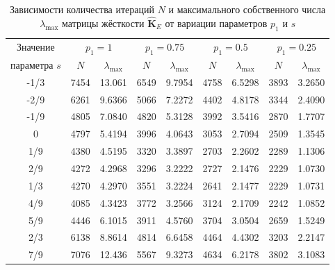 \begin{table}[htbp]
    \centering
    \begin{threeparttable}%
        \caption{Зависимости количества итераций $N$ и максимального собственного числа $\lambda_{\max}$ матрицы жёсткости $\widehat{\textbf{K}}_E$ от вариации параметров $p_1$ и $s$}\label{tab:MechanicalIterAndMaxEgien}
        \begin{tabular}{|c|c|c|c|c|c|c|c|c|}
			\hline
			Значение & \multicolumn{2}{c|}{$p_1 = 1$} & \multicolumn{2}{c|}{$p_1 = 0.75$} & \multicolumn{2}{c|}{$p_1 = 0.5$} & \multicolumn{2}{c|}{$p_1 = 0.25$} \\ 
			\cline{2-9}
			параметра $s$ & $N$  & $\lambda_{\max}$ & $N$  & $\lambda_{\max}$ & $N$  & $\lambda_{\max}$ & $N$  & $\lambda_{\max}$ \\ 
			\hline
			-1/3 & 7454 & 13.061 & 6549 & 9.7954 & 4758 & 6.5298 & 3893 & 3.2650 \\
			\hline
			-2/9 & 6261 & 9.6366 & 5066 & 7.2272 & 4402 & 4.8178 & 3344 & 2.4090 \\
			\hline
			-1/9 & 4805 & 7.0840 & 4820 & 5.3128 & 3992 & 3.5416 & 2870 & 1.7707 \\
			\hline
			   0 & 4797 & 5.4194 & 3996 & 4.0643 & 3053 & 2.7094 & 2509 & 1.3545 \\
			\hline   
			 1/9 & 4380 & 4.5195 & 3320 & 3.3897 & 2703 & 2.2602 & 2289 & 1.1306 \\
			\hline 
			 2/9 & 4272 & 4.2968 & 3296 & 3.2222 & 2727 & 2.1476 & 2229 & 1.0730 \\
			\hline 
			 1/3 & 4270 & 4.2970 & 3551 & 3.2224 & 2641 & 2.1477 & 2229 & 1.0731 \\
			\hline 
			 4/9 & 4085 & 4.3423 & 3772 & 3.2566 & 3124 & 2.1709 & 2242 & 1.0852 \\
			\hline 
			 5/9 & 4446 & 6.1015 & 3911 & 4.5760 & 3704 & 3.0504 & 2659 & 1.5249 \\
			\hline 
			 2/3 & 6138 & 8.8614 & 4814 & 6.6458 & 4464 & 4.4302 & 3203 & 2.2147 \\
			\hline 
			 7/9 & 7076 & 12.436 & 5567 & 9.3273 & 4634 & 6.2178 & 3802 & 3.1083 \\
			\hline
        \end{tabular}
    \end{threeparttable}
\end{table}


